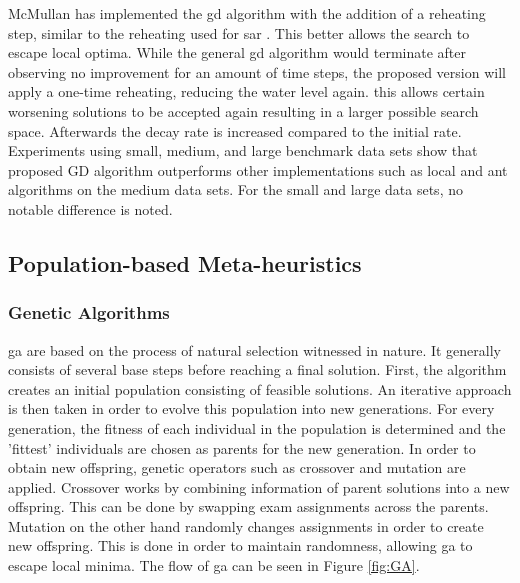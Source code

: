 McMullan \cite{mcmullan2007} has implemented the \acrlong{gd} algorithm with the addition of a reheating step, similar to the reheating used for \acrlong{sar} \cite{Goh2017}. This better allows the search to escape local optima. While the general \acrshort{gd} algorithm would terminate after observing no improvement for an amount of time steps, the proposed version will apply a one-time reheating, reducing the water level again. this allows certain worsening solutions to be accepted again resulting in a larger possible search space. Afterwards the decay rate is increased compared to the initial rate. Experiments using small, medium, and large benchmark data sets show that proposed GD algorithm outperforms other implementations such as \acrlong{local} and ant algorithms on the medium data sets. For the small and large data sets, no notable difference is noted.


\subsection{Population-based Meta-heuristics}
\subsubsection{Genetic Algorithms}

\acrfull{ga} \cite{Holland1975} are based on the process of natural selection witnessed in nature. It generally consists of several base steps before reaching a final solution. First, the algorithm creates an initial population consisting of feasible solutions. An iterative approach is then taken in order to evolve this population into new generations. For every generation, the fitness of each individual in the population is determined and the 'fittest' individuals are chosen as parents for the new generation. In order to obtain new offspring, genetic operators such as crossover and mutation are applied. Crossover works by combining information of parent solutions into a new offspring. This can be done by swapping exam assignments across the parents. Mutation on the other hand randomly changes assignments in order to create new offspring. This is done in order to maintain randomness, allowing \acrshort{ga} to escape local minima. The flow of \acrlong{ga} can be seen in Figure \ref{fig:GA}.

